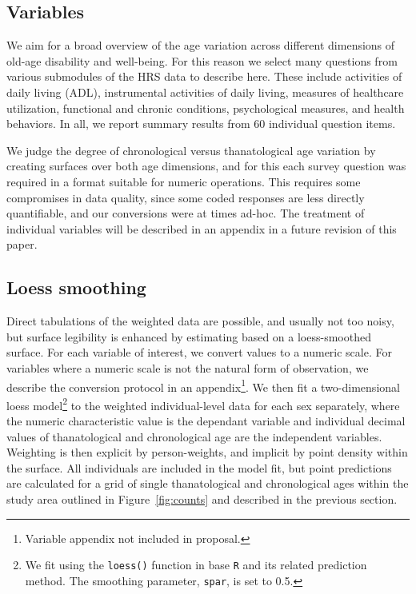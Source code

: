 \documentclass{article}
\begin{document}
\subsection{Variables}
We aim for a broad overview of the age variation across different dimensions of
old-age disability and well-being. For this reason we select many questions from
various submodules of the HRS data to describe here. These include activities of
daily living (ADL), instrumental activities of daily living, measures of
healthcare utilization, functional and chronic conditions, psychological
measures, and health behaviors. In all, we report summary results from 60
individual question items.

We judge the degree of chronological versus thanatological age variation by
creating surfaces over both age dimensions, and for this each survey question
was required in a format suitable for numeric operations. This requires some
compromises in data quality, since some coded responses are less directly
quantifiable, and our conversions were at times ad-hoc. The treatment of
individual variables will be described in an appendix in a future
revision of this paper.

\subsection{Loess smoothing}
Direct tabulations of the weighted data are possible, and usually not too noisy,
but surface legibility is enhanced by estimating based on a loess-smoothed
surface. For each variable of interest, we convert values to a numeric scale.
For variables where a numeric scale is not the natural form of observation, we
describe the conversion protocol in an appendix\footnote{Variable appendix not
included in proposal.}. We then fit a two-dimensional loess model\footnote{We
fit using the \texttt{loess()} function in base \texttt{R}
\citep{cleveland1992local,Rcore2013} and its related prediction method. The
smoothing parameter, \texttt{spar}, is set to 0.5.} to the weighted
individual-level data for each sex separately, where the numeric characteristic value is the dependant variable and individual decimal values of thanatological and chronological age are the independent variables.
Weighting is then explicit by person-weights, and implicit by point density
within the surface. All individuals are included in the model fit, but point
predictions are calculated for a grid of single thanatological and chronological
ages within the study area outlined in Figure~\ref{fig:counts} and described in
the previous section. 
\end{document}
